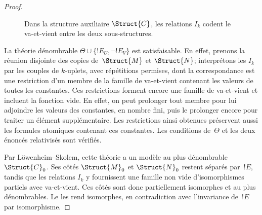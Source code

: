 \documentclass[../../../include/open-logic-section]{subfiles}
\begin{document}
\begin{proof}
\begin{figure}[h]
  \centering
  \caption{Dans la structure auxiliaire $\Struct{C}$,
    les relations $I_k$ codent le va-et-vient entre
    les deux sous-structures.}
\end{figure}

La théorie dénombrable
$\Theta\cup\{!E_U,\lnot !E_V\}$
est satisfaisable. En effet,
prenons la réunion disjointe des
copies de~$\Struct{M}$ et
$\Struct{N}$; interprétons les
$I_k$ par les couples de $k$-uplets, avec
répétitions permises, dont la correspondance est une
restriction d'un membre de la famille de va-et-vient
contenant les valeurs de toutes les constantes.
Ces restrictions forment encore une famille
de va-et-vient et incluent la fonction vide.
En effet, on peut prolonger tout membre
pour lui adjoindre les valeurs des constantes,
en nombre fini, puis le prolonger encore
pour traiter un élément supplémentaire.
Les restrictions ainsi obtenues préservent aussi
les formules atomiques contenant ces constantes. Les conditions de~$\Theta$
et les deux énoncés relativisés
sont vérifiés.

Par Löwenheim--Skolem, cette
théorie a un modèle au plus
dénombrable~$\Struct{C}_0$.
Ses côtés $\Struct{M}_0$ et
$\Struct{N}_0$ restent séparés
par~$!E$, tandis que les
relations $I_k$ y fournissent
une famille non vide
d'isomorphismes partiels avec
va-et-vient. Ces côtés sont donc
partiellement isomorphes et au
plus dénombrables. Le
les rend isomorphes, en
contradiction avec l'invariance
de~$!E$ par isomorphisme.
\end{proof}
\end{document}
